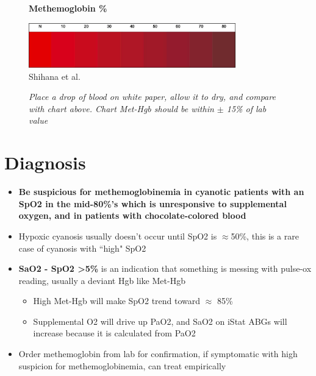 \documentclass[main.tex]{subfiles}
\begin{document}
\begin{figure}[hbt]
	\centering
	\caption{\textbf{Methemoglobin \%}}
	\label{img:methgb-gradient}
	\includegraphics[width=0.8\textwidth]{img/methemoglobinemia/color-chart.png}\\
	\raggedleft \footnotesize Shihana et al. \hspace{0.1\textwidth}
	\caption*{\footnotesize \textit{Place a drop of blood on white paper, allow it to dry, and compare with chart above. Chart Met-Hgb should be within $\pm$ 15\% of lab value}}
\end{figure}

\section{Diagnosis}

\begin{itemize}[noitemsep]
	\item \textbf{Be suspicious for methemoglobinemia in cyanotic patients with an SpO2 in the mid-80\%'s which is unresponsive to supplemental oxygen, and in patients with chocolate-colored blood}
	
	\item Hypoxic cyanosis usually doesn't occur until SpO2 is $\approx$50\%, this is a rare case of cyanosis with ``high" SpO2
	
	\item \textbf{SaO2 - SpO2 \textgreater 5\%} is an indication that something is messing with pulse-ox reading, usually a deviant Hgb like Met-Hgb
	\begin{itemize}[noitemsep]
		\item High Met-Hgb will make SpO2 trend toward $\approx$ 85\%
		\item Supplemental O2 will drive up PaO2, and SaO2 on iStat ABGs will increase because it is calculated from PaO2
	\end{itemize}
	
	\item Order methemoglobin from lab for confirmation, if symptomatic with high suspicion for methemoglobinemia, can treat empirically
\end{itemize}
\end{document}
